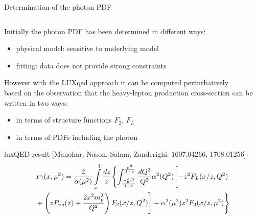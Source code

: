 \documentclass[aspectratio=169, 8pt,t]{beamer}
\begin{document}
\begin{frame}{Determination of the photon PDF}
  \begin{columns}[T]
    \begin{column}{0.59\textwidth}
      Initially the photon PDF has been determined in different ways:
      \begin{itemize}
        \item physical model: sensitive to underlying model
        \item fitting: data does not provide strong constraints
      \end{itemize}

      \vspace*{0.5em}
      However with the LUXqed approach it can be computed perturbatively \\ 
      based on the observation that the heavy-lepton production cross-section can be written in two ways:
      \begin{itemize}
        \item in terms of structure functions $F_2$, $F_L$
        \item in terms of PDFs including the photon
      \end{itemize}

      \vspace*{0.5em}
      luxQED result {\color{gray}\small[Manohar, Nason, Salam, Zanderighi: 1607.04266, 1708.01256]}:
      \begin{equation*}
        \begin{split}
          & x \gamma(x, \mu^2)
          =
          \frac{2}{\alpha (\mu^2)} \int\limits_x^1 \frac{dz}{z}
          \Biggl\{ \int_{m_p^2x^2 \over 1-z}^{\mu^2 \over 1-z} \frac{dQ^2}{Q^2}
          \alpha^2(Q^2) \Biggl[ -z^2 F_L(x/z, Q^2) \\
          & + \left( z P_{\gamma q}(z) + \frac{2 x^2 m_p^2}{Q^2} \right)
          F_2(x/z, Q^2)\Biggr] - \alpha^2(\mu^2) z^2 F_2(x/z, \mu^2)\Biggr\}
        \end{split}
      \end{equation*}
    \end{column}


\end{columns}
\end{frame}
\end{document}
